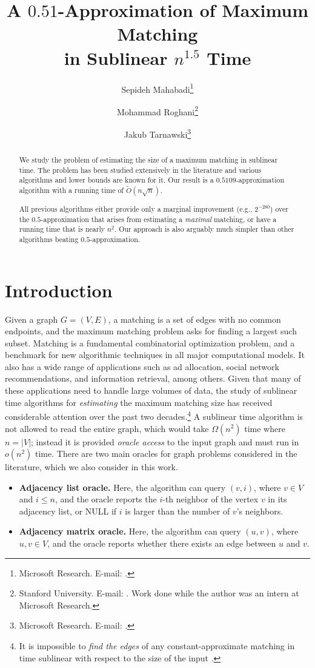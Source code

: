 \documentclass[letterpaper,11pt]{article}
\title{A $0.51$-Approximation of Maximum Matching \\ in Sublinear $n^{1.5}$ Time}
\author{Sepideh Mahabadi\thanks{Microsoft Research. E-mail: \email{smahabadi@microsoft.com}.} \and Mohammad Roghani\thanks{Stanford University. E-mail: \email{roghani@stanford.edu}. Work done while the author was an intern at Microsoft Research.} \and Jakub Tarnawski\thanks{Microsoft Research. E-mail: \email{jakub.tarnawski@microsoft.com}.}}
\date{}
\begin{document}
\maketitle

\begin{abstract}
We study the problem of estimating the size of a maximum matching in sublinear time. The problem has been studied extensively in the literature and various algorithms and lower bounds are known for it. Our result is a $0.5109$-approximation algorithm with a running time of $\tilde{O}(n\sqrt{n})$.
    
All previous algorithms either provide only a marginal improvement (e.g., $2^{-280}$) over the $0.5$-approximation that arises from estimating a \emph{maximal} matching, or have a running time that is nearly $n^2$. Our approach is also arguably much simpler than other algorithms beating $0.5$-approximation.
\end{abstract}

\section{Introduction}
Given a graph $G=(V,E)$, a matching is a set of edges with no common endpoints, and the maximum matching problem asks for finding a largest such subset. Matching is a fundamental combinatorial optimization problem,
and a benchmark for new algorithmic techniques in all major computational models.
It also has a wide range of applications such as ad allocation, social network recommendations, and information retrieval, among others. Given that many of these applications need to handle large volumes of data, the study of sublinear time algorithms for {\em estimating} the maximum matching size has received considerable attention over the past two decades.\footnote{It is impossible to \emph{find the edges} of any constant-approximate matching in time sublinear with respect to the size of the input \cite{ParnasRon07}.} A sublinear time algorithm is not allowed to read the entire graph, which would take $\Omega(n^2)$ time where $n=|V|$; instead it  is provided \emph{oracle access} to the input graph and must run in $o(n^2)$ time. There are two main oracles for graph problems considered in the literature, which we also consider in this work.

\begin{itemize}\item \textbf{Adjacency list oracle.} Here, the algorithm can query $(v,i)$, where $v\in V$ and $i\leq n$, and the oracle reports the $i$-th neighbor of the vertex $v$ in its adjacency list, or NULL if $i$ is larger than the number of $v$'s neighbors.
\item \textbf{Adjacency matrix oracle.} Here, the algorithm can query $(u,v)$, where $u,v\in V$, and the oracle reports whether there exists an edge between $u$ and $v$.
\end{itemize}
\end{document}
